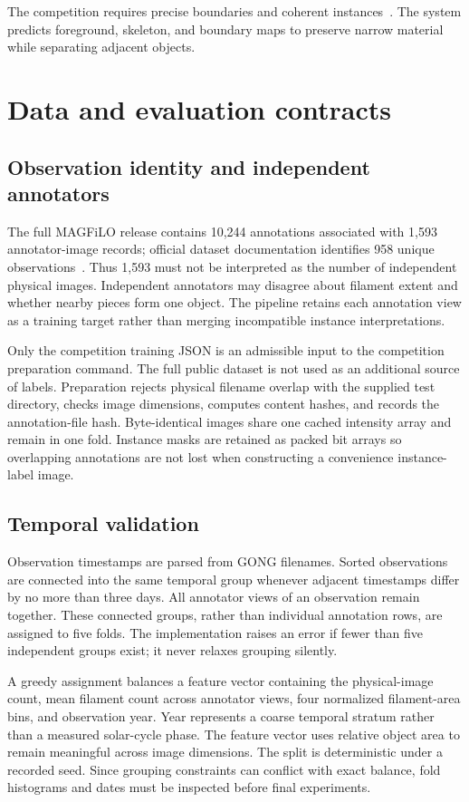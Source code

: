 \documentclass[conference]{IEEEtran}
\begin{document}
The competition requires precise boundaries and coherent instances~\cite{challenge}. The system predicts foreground, skeleton, and boundary maps to preserve narrow material while separating adjacent objects.

\section{Data and evaluation contracts}
\subsection{Observation identity and independent annotators}
The full MAGFiLO release contains 10,244 annotations associated with 1,593 annotator-image records; official dataset documentation identifies 958 unique observations~\cite{magfiloweb}. Thus 1,593 must not be interpreted as the number of independent physical images. Independent annotators may disagree about filament extent and whether nearby pieces form one object. The pipeline retains each annotation view as a training target rather than merging incompatible instance interpretations.

Only the competition training JSON is an admissible input to the competition preparation command. The full public dataset is not used as an additional source of labels. Preparation rejects physical filename overlap with the supplied test directory, checks image dimensions, computes content hashes, and records the annotation-file hash. Byte-identical images share one cached intensity array and remain in one fold. Instance masks are retained as packed bit arrays so overlapping annotations are not lost when constructing a convenience instance-label image.

\subsection{Temporal validation}
Observation timestamps are parsed from GONG filenames. Sorted observations are connected into the same temporal group whenever adjacent timestamps differ by no more than three days. All annotator views of an observation remain together. These connected groups, rather than individual annotation rows, are assigned to five folds. The implementation raises an error if fewer than five independent groups exist; it never relaxes grouping silently.

A greedy assignment balances a feature vector containing the physical-image count, mean filament count across annotator views, four normalized filament-area bins, and observation year. Year represents a coarse temporal stratum rather than a measured solar-cycle phase. The feature vector uses relative object area to remain meaningful across image dimensions. The split is deterministic under a recorded seed. Since grouping constraints can conflict with exact balance, fold histograms and dates must be inspected before final experiments.
\end{document}
